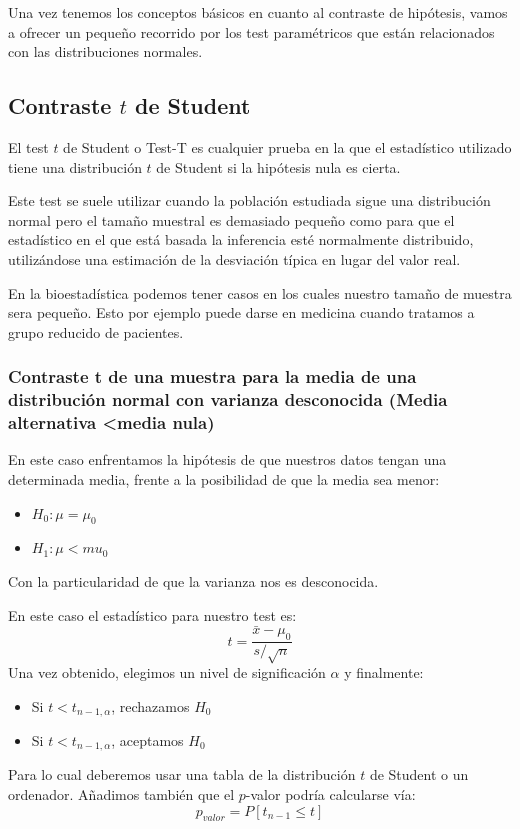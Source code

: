 \documentclass[a4paper,12pt]{article}
\begin{document}
Una vez tenemos los conceptos básicos en cuanto al contraste de hipótesis, vamos a ofrecer un pequeño recorrido por los test paramétricos que están relacionados con las distribuciones normales.


 \subsection{Contraste $t$ de Student}
 El test $t$ de Student o Test-T es cualquier prueba en la que el estadístico utilizado tiene una distribución $t$ de Student si la hipótesis nula es cierta.
 
 Este test se suele utilizar cuando la población estudiada sigue una distribución normal pero el tamaño muestral es demasiado pequeño como para que el estadístico en el que está basada la inferencia esté normalmente distribuido, utilizándose una estimación de la desviación típica en lugar del valor real. 
 
 En la bioestadística podemos tener casos en los cuales nuestro tamaño de muestra sera pequeño. Esto por ejemplo puede darse en medicina cuando tratamos a grupo reducido de pacientes.

 \subsubsection{Contraste t de una muestra para la media de una distribución normal con varianza desconocida (Media alternativa <media nula)  }
 
 En este caso enfrentamos la hipótesis de que nuestros datos tengan una determinada media, frente a la posibilidad  de que la media sea menor: 
 \begin{itemize}
 	\item $H_0:\mu=\mu_0$
 	\item $H_1: \mu<mu_0$
 \end{itemize}
 Con la particularidad de que la varianza nos es desconocida.
 
 En este caso el estadístico para nuestro test es: 
 $$t=\frac{\bar{x}-\mu_0}{s/\sqrt{n}}$$
 Una vez obtenido, elegimos un nivel de significación $\alpha$ y finalmente:
 \begin{itemize}
 	\item Si $t<t_{n-1,\alpha}$, rechazamos $H_0$
 	\item Si $t<t_{n-1,\alpha}$, aceptamos $H_0$
 \end{itemize}
 Para lo cual deberemos usar una tabla de la distribución $t$ de Student o un ordenador.
 Añadimos también que el $p$-valor podría calcularse vía:
 $$p_{valor}=P[t_{n-1}\leq t]$$
 
\end{document}
